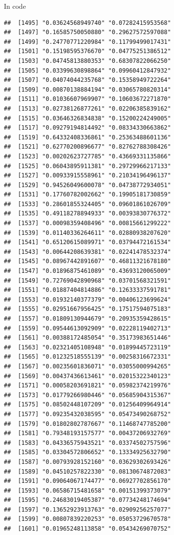 \documentclass[ignorenonframetext,]{beamer}
\begin{document}
\begin{frame}[fragile]{In code}
\begin{verbatim}
##  [1495] "0.03624568949740" "0.07282415953568"
##  [1497] "0.16585750050880" "0.29627572597088"
##  [1499] "0.24770771220984" "0.11799499017431"
##  [1501] "0.15198595376670" "0.04775251386512"
##  [1503] "0.04745813880353" "0.68307822066250"
##  [1505] "0.03399630898864" "0.09960412847932"
##  [1507] "0.04074044235768" "0.15358949722264"
##  [1509] "0.00870138884194" "0.03065780820314"
##  [1511] "0.01036607969907" "0.10603672271870"
##  [1513] "0.02738126877261" "0.02206385839162"
##  [1515] "0.03646326834838" "0.15200224249005"
##  [1517] "0.09279194814492" "0.08334330663862"
##  [1519] "0.64332408336861" "0.25363488601136"
##  [1521] "0.62770200896677" "0.82762788308426"
##  [1523] "0.00202623727785" "0.43669331135866"
##  [1525] "0.06043895911381" "0.29729966217133"
##  [1527] "0.00933915558961" "0.21034196496137"
##  [1529] "0.94526049600078" "0.04738772934051"
##  [1531] "0.17760782002662" "0.19905181730859"
##  [1533] "0.28601855324405" "0.09601861026709"
##  [1535] "0.49118278894933" "0.00393830776372"
##  [1537] "0.00098359408496" "0.00815661299222"
##  [1539] "0.01140336264611" "0.02880938207620"
##  [1541] "0.65120615089971" "0.03794472161534"
##  [1543] "0.00644208639381" "0.02241478532374"
##  [1545] "0.08967442891607" "0.46811321678180"
##  [1547] "0.01896875461089" "0.43693120065009"
##  [1549] "0.72769042890968" "0.03701568321591"
##  [1551] "0.01887404814886" "0.12633337591781"
##  [1553] "0.01932140377379" "0.00406123699624"
##  [1555] "0.02951667956425" "0.17517594075183"
##  [1557] "0.01809130944679" "0.20935359428615"
##  [1559] "0.09544613092909" "0.02228119402713"
##  [1561] "0.00388172485054" "0.35173983651446"
##  [1563] "0.02321405108948" "0.01899445723119"
##  [1565] "0.01232518555139" "0.00258316672331"
##  [1567] "0.00235601836071" "0.03055000994265"
##  [1569] "0.00437436613461" "0.02015322340123"
##  [1571] "0.00058203691821" "0.05982374219976"
##  [1573] "0.01779266980446" "0.05685904315367"
##  [1575] "0.08502448107209" "0.01256409964914"
##  [1577] "0.09235432038595" "0.05473490268752"
##  [1579] "0.01802802787667" "0.11468747785200"
##  [1581] "0.79348193157577" "0.00437206932769"
##  [1583] "0.04336575943521" "0.03374502757596"
##  [1585] "0.03304572806652" "0.13334925632790"
##  [1587] "0.00793928152160" "0.03629302693426"
##  [1589] "0.04510257822330" "0.08130674872083"
##  [1591] "0.09064067174477" "0.06927702856170"
##  [1593] "0.06586715481658" "0.00151399373079"
##  [1595] "0.24683019405387" "0.07734248174694"
##  [1597] "0.13652923913763" "0.02909256257077"
##  [1599] "0.00807839220253" "0.05053729670578"
##  [1601] "0.01965248113858" "0.05434269070752"

\end{verbatim}
\end{frame}
\end{document}
